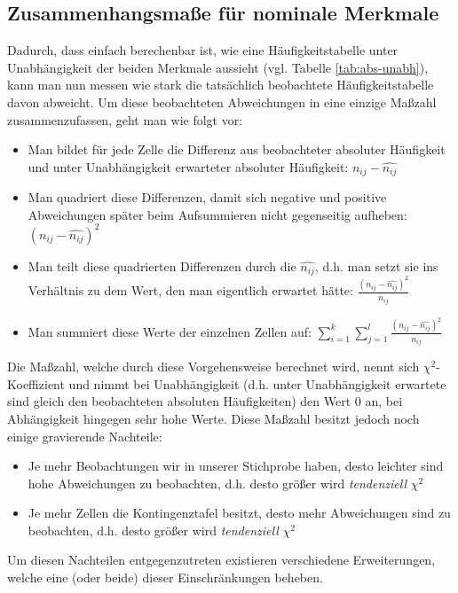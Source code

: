 \documentclass[a4paper]{article}
\begin{document}
\clearpage

\subsection{Zusammenhangsmaße für nominale Merkmale}\label{sec:zshg-nom}
Dadurch, dass einfach berechenbar ist, wie eine Häufigkeitstabelle unter Unabhängigkeit der beiden Merkmale aussieht (vgl. Tabelle \ref{tab:abs-unabh}), kann man nun messen wie stark die tatsächlich beobachtete Häufigkeitstabelle davon abweicht. Um diese beobachteten Abweichungen in eine einzige Maßzahl zusammenzufassen, geht man wie folgt vor:
\begin{itemize}
    \item Man bildet für jede Zelle die Differenz aus beobachteter absoluter Häufigkeit und unter Unabhängigkeit erwarteter absoluter Häufigkeit: $n_{ij} - \hat{n_{ij}}$ 
    \item Man quadriert diese Differenzen, damit sich negative und positive Abweichungen später beim Aufsummieren nicht gegenseitig aufheben: $(n_{ij} - \hat{n_{ij}})^2$ 
    \item Man teilt diese quadrierten Differenzen durch die $\hat{n_{ij}}$, d.h. man setzt sie ins Verhältnis zu dem Wert, den man eigentlich erwartet hätte: $\frac{(n_{ij} - \hat{n_{ij}})^2}{\hat{n_{ij}}}$
    \item Man summiert diese Werte der einzelnen Zellen auf: $\sum_{i=1}^k\sum_{j=1}^l \frac{(n_{ij} - \hat{n_{ij}})^2}{\hat{n_{ij}}}$
\end{itemize}
Die Maßzahl, welche durch diese Vorgehensweise berechnet wird, nennt sich $\chi^2$-Koeffizient und nimmt bei Unabhängigkeit (d.h. unter Unabhängigkeit erwartete sind gleich den beobachteten absoluten Häufigkeiten) den Wert 0 an, bei Abhängigkeit hingegen sehr hohe Werte. Diese Maßzahl besitzt jedoch noch einige gravierende Nachteile:
\begin{itemize}
    \item Je mehr Beobachtungen wir in unserer Stichprobe haben, desto leichter sind hohe Abweichungen zu beobachten, d.h. desto größer wird \textit{tendenziell} $\chi^2$
    \item Je mehr Zellen die Kontingenztafel besitzt, desto mehr Abweichungen sind zu beobachten, d.h. desto größer wird \textit{tendenziell} $\chi^2$
\end{itemize}
Um diesen Nachteilen entgegenzutreten existieren verschiedene Erweiterungen, welche eine (oder beide) dieser Einschränkungen beheben.\\
\end{document}
